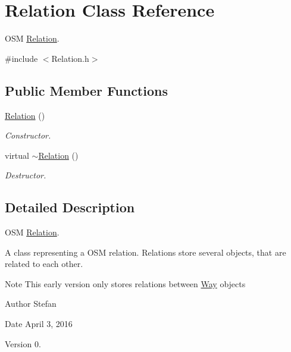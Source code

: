 \hypertarget{classRelation}{\section{Relation Class Reference}
\label{classRelation}
}


O\+S\+M \hyperlink{classRelation}{Relation}.  




{\ttfamily \#include $<$Relation.\+h$>$}

\subsection*{Public Member Functions}
\begin{DoxyCompactItemize}
\item 
\hyperlink{classRelation_a55f2c9d5ae6413cb72c114e583e359ef}{Relation} ()
\begin{DoxyCompactList}\small\item\em Constructor. \end{DoxyCompactList}\item 
virtual \hyperlink{classRelation_ad8bc5c349f9d98b15972fd0b09f341cc}{$\sim$\+Relation} ()
\begin{DoxyCompactList}\small\item\em Destructor. \end{DoxyCompactList}\end{DoxyCompactItemize}


\subsection{Detailed Description}
O\+S\+M \hyperlink{classRelation}{Relation}. 

A class representing a O\+S\+M relation. Relations store several objects, that are related to each other.

\begin{DoxyNote}{Note}
This early version only stores relations between \hyperlink{classWay}{Way} objects
\end{DoxyNote}
\begin{DoxyAuthor}{Author}
Stefan 
\end{DoxyAuthor}
\begin{DoxyDate}{Date}
April 3, 2016 
\end{DoxyDate}
\begin{DoxyVersion}{Version}
0. 
\end{DoxyVersion}


